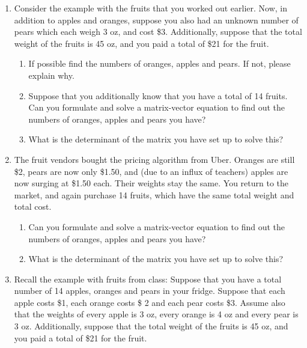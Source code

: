 \begin{prob}
\begin{enumerate}
\item Consider the example with the fruits that you worked out earlier. Now,  in addition to apples and oranges, suppose you also had an unknown number of pears which each weigh 3 oz, and cost \$3. Additionally, suppose that the total weight of the fruits is 45 oz, and you paid a total of \$21 for the fruit.

    \begin{enumerate}
    \item If possible find the numbers of oranges, apples and pears. If not, please explain why.
    
    \item Suppose that you additionally know that you have a total of 14 fruits. Can you formulate and solve a matrix-vector equation to find out the numbers of oranges, apples and pears you have?
    
    \item What is the determinant of the matrix you have set up to solve this?
    \end{enumerate}
    
\item The fruit vendors bought the pricing algorithm from Uber. Oranges are still \$2, pears are now only \$1.50, and (due to an influx of teachers) apples are now surging at \$1.50 each. Their weights stay the same. You return to the market, and again purchase 14 fruits, which have the same total weight and total cost.
\begin{enumerate}
	\item Can you formulate and solve a matrix-vector equation to find out the numbers of oranges, apples and pears you have?
	
    \item What is the determinant of the matrix you have set up to solve this?
 \end{enumerate}

\item Recall the example with fruits from class: Suppose that you have a total number of 14 apples, oranges and pears in your fridge. Suppose that each apple costs \$1, each orange costs \$ 2 and each pear costs \$3. Assume also that the weights of every apple is 3 oz, every orange is 4  oz and every pear is 3 oz.  Additionally, suppose that the total weight of the fruits is 45 oz, and you paid a total of \$21 for the fruit.


\end{enumerate}
\end{prob}
